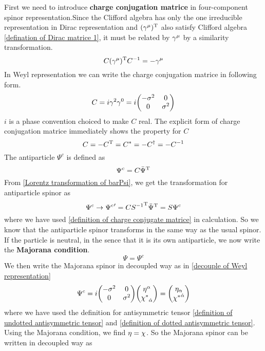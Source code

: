 First we need to introduce \textbf{charge conjugation matrice} in four-component spinor representation.Since the Clifford algebra has only the one irreducible representation in Dirac representation and $(\gamma^{\mu})^{\text{T}}$ also satisfy Clifford algebra \eqref{defination of Dirac matrice 1}, it must be related by $\gamma^{\mu}$ by a similarity transformation. 
\begin{equation}\label{definition of charge conjugate matrice}
  C (\gamma^{\mu})^{\text{T}} C^{-1} = -\gamma^{\mu}
\end{equation}
In Weyl representation we can write the charge conjugation matrice in following form.
\begin{equation}
C = i \g^2\g^0 
= i\mqty(-\s^{2} & 0    \\
          0      & \s^{2})
\end{equation}
$i$ is a phase convention choiced to make $C$ real. The explicit form of charge conjugation matrice immediately shows the property for $C$
\begin{equation}
C = - C^{\text{T}} = C^{*} = -C^{\dagger} = -C^{-1}
\end{equation}
The antiparticle $\Psi^{c}$ is defined as
\begin{equation}
\Psi^{c} = C \bar{\Psi}^{\text{T}}
\end{equation}
From \eqref{Lorentz transformation of barPsi}, we get the transformation for antiparticle spinor as
\begin{equation}
\Psi^{c} \rightarrow {\Psi^{c}}' = C {S^{-1}}^{\text{T}} {\bar\Psi}^{\text{T}}
 =S \Psi^{c}
\end{equation}
where we have used \eqref{definition of charge conjugate matrice} in calculation. So we know that the antiparticle spinor transforms in the same way as the usual spinor. If the particle is neutral, in the sence that it is its own antiparticle, we now write the \textbf{Majorana condition}.
\begin{equation}\label{Majorana condition}
 \Psi = \Psi^{c}
\end{equation}
We then write the Majorana spinor in decoupled way as in \eqref{decouple of Weyl representation} 
\begin{equation}
\Psi^{c} = i\mqty(-\s^{2} & 0    \\
           0      & \s^{2})
           \mqty(\h^{\a}  \\  \lc_{\doa})
         = \mqty(\h_{\a} \\ \lc^{\doa})
\end{equation}
where we have used the definition for antisymmetric tensor \eqref{definition of undotted antisymmetric tensor} and \eqref{definition of dotted antisymmetric tensor}. Using the Majorana condition, we find $\eta = \chi$. So the Majorana spinor can be written in decoupled way as
